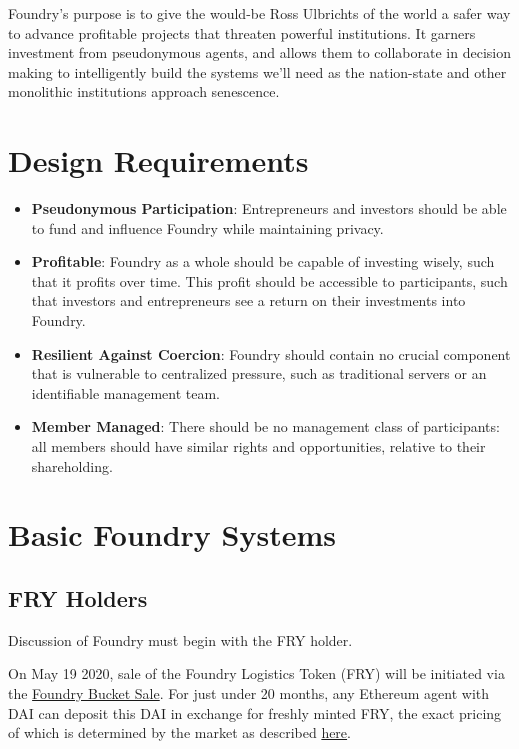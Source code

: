 Foundry's purpose is to give the would-be Ross Ulbrichts of the world a safer way to advance profitable projects that threaten powerful institutions. It garners investment from pseudonymous agents, and allows them to collaborate in decision making to intelligently build the systems we'll need as the nation-state and other monolithic institutions approach senescence.

\section{Design Requirements} \label{design-requirements}

\begin{itemize}

\item \textbf{Pseudonymous Participation}: Entrepreneurs and investors should be able to fund and influence Foundry while maintaining privacy.

\item \textbf{Profitable}: Foundry as a whole should be capable of investing wisely, such that it profits over time. This profit should be accessible to participants, such that investors and entrepreneurs see a return on their investments into Foundry.

\item \textbf{Resilient Against Coercion}: Foundry should contain no crucial component that is vulnerable to centralized pressure, such as traditional servers or an identifiable management team.

\item \textbf{Member Managed}: There should be no management class of participants: all members should have similar rights and opportunities, relative to their shareholding.

\end{itemize}

\section{Basic Foundry Systems} \label{basic}

\subsection{FRY Holders} \label{fry-holders}

Discussion of Foundry must begin with the FRY holder.

On May 19 2020, sale of the Foundry Logistics Token (FRY) will be initiated via the \href{https://foundrydao.com/faq/#about-the-token-sale}{Foundry Bucket Sale}. For just under 20 months, any Ethereum agent with DAI can deposit this DAI in exchange for freshly minted FRY, the exact pricing of which is determined by the market as described \href{https://foundrydao.com/faq/#how-much-is-the-sale-looking-to-raise}{here}.

